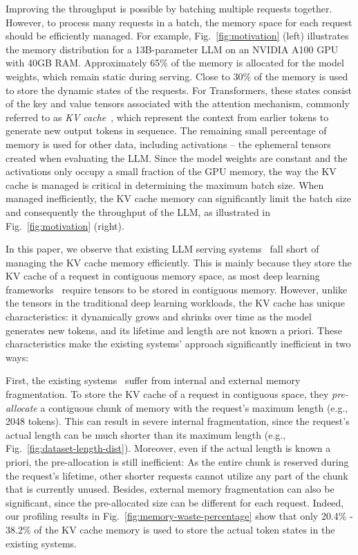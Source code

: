 Improving the throughput is possible by batching multiple requests together. However, to process many requests in a batch, the memory space for each request should be efficiently managed. For example, Fig.~\ref{fig:motivation} (left) illustrates the memory distribution for a 13B-parameter LLM on an NVIDIA A100 GPU with 40GB RAM. Approximately 65\% of the memory is allocated for the model weights, which remain static during serving. Close to 30\% of the memory is used to store the dynamic states of the requests. For Transformers, these states consist of the key and value tensors associated with the attention mechanism, commonly referred to as \emph{KV cache}~\cite{pope2022efficiently}, which represent the context from earlier tokens to generate new output tokens in sequence. The remaining small percentage of memory is used for other data, including activations – the ephemeral tensors created when evaluating the LLM. Since the model weights are constant and the activations only occupy a small fraction of the GPU memory, the way the KV cache is managed is critical in determining the maximum batch size. When managed inefficiently, the KV cache memory can significantly limit the batch size and consequently the throughput of the LLM, as illustrated in Fig.~\ref{fig:motivation} (right).

In this paper, we observe that existing LLM serving systems~\cite{yu2022orca,nvidiaft} fall short of managing the KV cache memory efficiently. This is mainly because they store the KV cache of a request in contiguous memory space, as most deep learning frameworks~\cite{paszke2019pytorch, olston2017tensorflow} require tensors to be stored in contiguous memory. However, unlike the tensors in the traditional deep learning workloads, the KV cache has unique characteristics: it dynamically grows and shrinks over time as the model generates new tokens, and its lifetime and length are not known a priori. These characteristics make the existing systems' approach significantly inefficient in two ways:

First, the existing systems~\cite{yu2022orca,nvidiaft} suffer from internal and external memory fragmentation. To store the KV cache of a request in contiguous space, they \emph{pre-allocate} a contiguous chunk of memory with the request's maximum length (e.g., 2048 tokens). This can result in severe internal fragmentation, since the request's actual length can be much shorter than its maximum length (e.g., Fig.~\ref{fig:dataset-length-dist}).
Moreover, even if the actual length is known a priori, the pre-allocation is still inefficient: As the entire chunk is reserved during the request's lifetime, other shorter requests cannot utilize any part of the chunk that is currently unused. Besides, external memory fragmentation can also be significant, since the pre-allocated size can be different for each request. Indeed, our profiling results in Fig.~\ref{fig:memory-waste-percentage} show that only 20.4\% - 38.2\% of the KV cache memory is used to store the actual token states in the existing systems.

